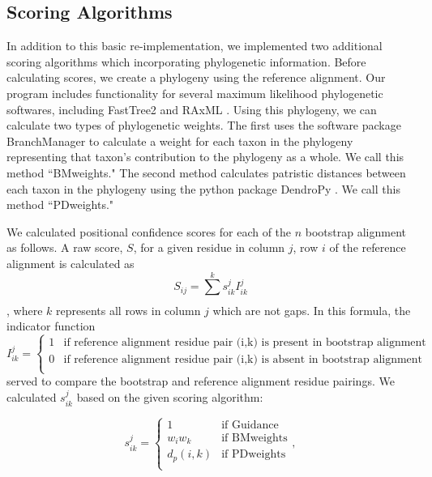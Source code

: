 \documentclass[10pt]{article}
\begin{document}
\subsection*{Scoring Algorithms}
In addition to this basic re-implementation, we implemented two additional scoring algorithms which incorporating phylogenetic information. Before calculating scores, we create a phylogeny using the reference alignment. Our program includes functionality for several maximum likelihood phylogenetic softwares, including FastTree2 \citep{Price2010} and RAxML \citep{Stamatakis2006}. Using this phylogeny, we can calculate two types of phylogenetic weights. The first uses the software package BranchManager \citep{Stone2007} to calculate a weight for each taxon in the phylogeny representing that taxon's contribution to the phylogeny as a whole. We call this method ``BMweights." The second method calculates patristic distances between each taxon in the phylogeny using the python package DendroPy \citep{Sukumaran2010}. We call this method ``PDweights."


We calculated positional confidence scores for each of the $n$ bootstrap alignment as follows. A raw score, $S$, for a given residue in column $j$, row $i$ of the reference alignment is calculated as \begin{equation} S_{ij} = \sum\limits_{}^k s_{ik}^j I_{ik}^j\end{equation}, where $k$ represents all rows in column $j$ which are not gaps. 
In this formula, the indicator function 
\begin{equation}I_{ik}^j = \left\{ \begin{array}{rl}

              1                         &\mbox{if reference alignment residue pair (i,k) is present in bootstrap alignment} \\
              0            &\mbox{if reference alignment residue pair (i,k) is absent in bootstrap alignment} \\
                     \end{array} \right. 
\end{equation}
served to compare the bootstrap and reference alignment residue pairings.
We calculated $s_{ik}^j$ based on the given scoring algorithm:

\begin{equation}
s_{ik}^j = \left\{ \begin{array}{rl}

              1                         &\mbox{if Guidance} \\
              w_iw_k              &\mbox{if BMweights} \\
              d_p(i,k)              &\mbox{if PDweights} \\
                     \end{array} \right.,
\end{equation}
\end{document}
